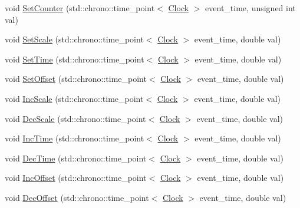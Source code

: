 \begin{DoxyCompactItemize}
\item 
void \mbox{\hyperlink{classDimension_a75c6a1a1e09c40b5860dc11a83384d9f}{Set\+Counter}} (std\+::chrono\+::time\+\_\+point$<$ \mbox{\hyperlink{universe_8h_a0ef8d951d1ca5ab3cfaf7ab4c7a6fd80}{Clock}} $>$ event\+\_\+time, unsigned int val)
\item 
void \mbox{\hyperlink{classDimension_a7f655ea002e8f9614a8c5cfa1807c49c}{Set\+Scale}} (std\+::chrono\+::time\+\_\+point$<$ \mbox{\hyperlink{universe_8h_a0ef8d951d1ca5ab3cfaf7ab4c7a6fd80}{Clock}} $>$ event\+\_\+time, double val)
\item 
void \mbox{\hyperlink{classDimension_a0558d45fe020ba1d1895e521a411decb}{Set\+Time}} (std\+::chrono\+::time\+\_\+point$<$ \mbox{\hyperlink{universe_8h_a0ef8d951d1ca5ab3cfaf7ab4c7a6fd80}{Clock}} $>$ event\+\_\+time, double val)
\item 
void \mbox{\hyperlink{classDimension_af74dd7af3af95c0a51b001b6ad665300}{Set\+Offset}} (std\+::chrono\+::time\+\_\+point$<$ \mbox{\hyperlink{universe_8h_a0ef8d951d1ca5ab3cfaf7ab4c7a6fd80}{Clock}} $>$ event\+\_\+time, double val)
\item 
void \mbox{\hyperlink{classDimension_aa323eaa2c592e498d48e0739009ec313}{Inc\+Scale}} (std\+::chrono\+::time\+\_\+point$<$ \mbox{\hyperlink{universe_8h_a0ef8d951d1ca5ab3cfaf7ab4c7a6fd80}{Clock}} $>$ event\+\_\+time, double val)
\item 
void \mbox{\hyperlink{classDimension_a4bd8e584c3bb68ebd7ca0463f8905813}{Dec\+Scale}} (std\+::chrono\+::time\+\_\+point$<$ \mbox{\hyperlink{universe_8h_a0ef8d951d1ca5ab3cfaf7ab4c7a6fd80}{Clock}} $>$ event\+\_\+time, double val)
\item 
void \mbox{\hyperlink{classDimension_afc61c6d6d68ec0ed461458d504fec16f}{Inc\+Time}} (std\+::chrono\+::time\+\_\+point$<$ \mbox{\hyperlink{universe_8h_a0ef8d951d1ca5ab3cfaf7ab4c7a6fd80}{Clock}} $>$ event\+\_\+time, double val)
\item 
void \mbox{\hyperlink{classDimension_a25978bcb1f62aa7ed909463d08d92ca4}{Dec\+Time}} (std\+::chrono\+::time\+\_\+point$<$ \mbox{\hyperlink{universe_8h_a0ef8d951d1ca5ab3cfaf7ab4c7a6fd80}{Clock}} $>$ event\+\_\+time, double val)
\item 
void \mbox{\hyperlink{classDimension_aaf18cc220562b30f9e7aee92f16cc08e}{Inc\+Offset}} (std\+::chrono\+::time\+\_\+point$<$ \mbox{\hyperlink{universe_8h_a0ef8d951d1ca5ab3cfaf7ab4c7a6fd80}{Clock}} $>$ event\+\_\+time, double val)
\item 
void \mbox{\hyperlink{classDimension_a2017e62d4b3caf31f4f1b6b5cf59a798}{Dec\+Offset}} (std\+::chrono\+::time\+\_\+point$<$ \mbox{\hyperlink{universe_8h_a0ef8d951d1ca5ab3cfaf7ab4c7a6fd80}{Clock}} $>$ event\+\_\+time, double val)

\end{DoxyCompactItemize}
